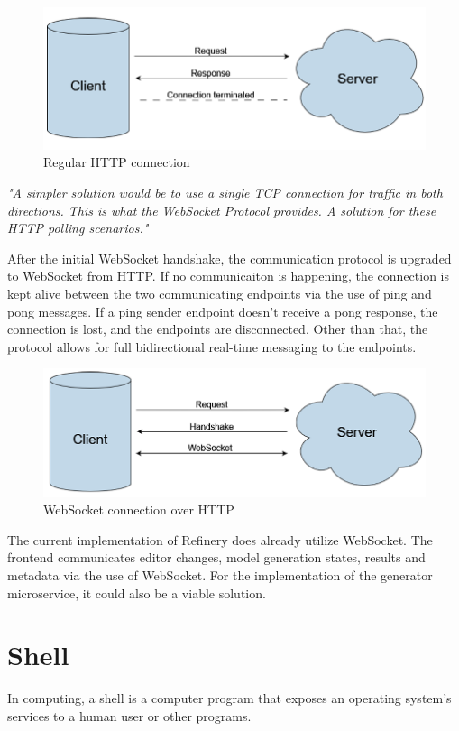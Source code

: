	\begin{figure}[h!]
		\includegraphics{include/imgs/http.PNG}
		\caption{Regular HTTP connection}
	\end{figure}

	\textit{"A simpler solution would be to use a single TCP connection for
	traffic in both directions. This is what the WebSocket Protocol
	provides. A solution for these HTTP polling scenarios."}

	After the initial WebSocket handshake, the communication protocol is upgraded to WebSocket from HTTP.
	If no communicaiton is happening, the connection is kept alive between the two communicating endpoints via the use of ping and pong messages.
	If a ping sender endpoint doesn't receive a pong response, the connection is lost, and the endpoints are disconnected.
	Other than that, the protocol allows for full bidirectional real-time messaging to the endpoints.

	\begin{figure}[h!]
		\includegraphics{include/imgs/websocket.PNG}
		\caption{WebSocket connection over HTTP}
	\end{figure}

	The current implementation of Refinery does already utilize WebSocket. The frontend communicates editor changes, model generation
	states, results and metadata via the use of WebSocket. 
	For the implementation of the generator microservice, it could also be a viable solution.

\section{Shell} \label{backgrshell}
	In computing, a shell \cite{shell} is a computer program that exposes an operating system's services to a human user or other programs. 

